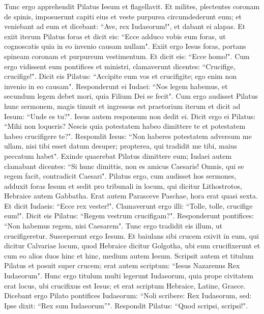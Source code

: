\begin{biblechapter} 
\verse Tunc ergo apprehendit Pilatus Iesum et flagellavit. 
\verse Et milites, plectentes coronam de spinis, imposuerunt capiti eius et veste purpurea circumdederunt eum; 
\verse et veniebant ad eum et dicebant: “Ave, rex Iudaeorum!", et dabant ei alapas.  
\verse Et exiit iterum Pilatus foras et dicit eis: “Ecce adduco vobis eum foras, ut cognoscatis quia in eo invenio causam nullam". 
\verse Exiit ergo Iesus foras, portans spineam coronam et purpureum vestimentum. Et dicit eis: “Ecce homo!".  
\verse Cum ergo vidissent eum pontifices et ministri, clamaverunt dicentes: “Crucifige, crucifige!". Dicit eis Pilatus: “Accipite eum vos et crucifigite; ego enim non invenio in eo causam". 
\verse Responderunt ei Iudaei: “Nos legem habemus, et secundum legem debet mori, quia Filium Dei se fecit". 
\verse Cum ergo audisset Pilatus hunc sermonem, magis timuit 
\verse et ingressus est praetorium iterum et dicit ad Iesum: “Unde es tu?". Iesus autem responsum non dedit ei. 
\verse Dicit ergo ei Pilatus: “Mihi non loqueris? Nescis quia potestatem habeo dimittere te et potestatem habeo crucifigere te?". 
\verse Respondit Iesus: “Non haberes potestatem adversum me ullam, nisi tibi esset datum desuper; propterea, qui tradidit me tibi, maius peccatum habet". 
\verse Exinde quaerebat Pilatus dimittere eum; Iudaei autem clamabant dicentes: “Si hunc dimittis, non es amicus Caesaris! Omnis, qui se regem facit, contradicit Caesari". 
\verse Pilatus ergo, cum audisset hos sermones, adduxit foras Iesum et sedit pro tribunali in locum, qui dicitur Lithostrotos, Hebraice autem Gabbatha. 
\verse Erat autem Parasceve Paschae, hora erat quasi sexta. Et dicit Iudaeis: “Ecce rex vester!". 
\verse Clamaverunt ergo illi: “Tolle, tolle, crucifige eum!". Dicit eis Pilatus: “Regem vestrum crucifigam?". Responderunt pontifices: “Non habemus regem, nisi Caesarem". 
\verse Tunc ergo tradidit eis illum, ut crucifigeretur. Susceperunt ergo Iesum. 
\verse Et baiulans sibi crucem exivit in eum, qui dicitur Calvariae locum, quod Hebraice dicitur Golgotha, 
\verse ubi eum crucifixerunt et cum eo alios duos hinc et hinc, medium autem Iesum. 
\verse Scripsit autem et titulum Pilatus et posuit super crucem; erat autem scriptum: “Iesus Nazarenus Rex Iudaeorum".  
\verse Hunc ergo titulum multi legerunt Iudaeorum, quia prope civitatem erat locus, ubi crucifixus est Iesus; et erat scriptum Hebraice, Latine, Graece. 
\verse Dicebant ergo Pilato pontifices Iudaeorum: “Noli scribere: Rex Iudaeorum, sed: Ipse dixit: “Rex sum Iudaeorum”". 
\verse Respondit Pilatus: “Quod scripsi, scripsi!". 

\end{biblechapter}

